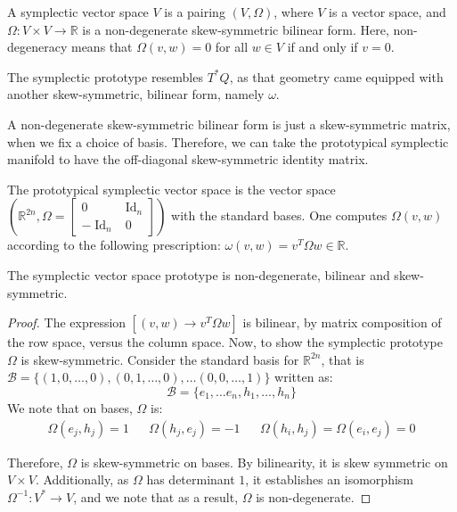 \begin{defn}
A symplectic vector space $V$ is a pairing $(V,\Omega)$, where $V$ is a vector space, and $\Omega: V \times V \to \mathbb{R}$ is a non-degenerate skew-symmetric bilinear form. Here, non-degeneracy means that $\Omega(v, w) = 0$ for all $w \in V$ if and only if $v = 0$.
\end{defn}

\begin{remark}
The symplectic prototype resembles $T^{*} Q$, as that geometry came equipped with another skew-symmetric, bilinear form, namely $\omega$.
\end{remark}

\begin{remark}
A non-degenerate skew-symmetric bilinear form is just a skew-symmetric matrix, when we fix a choice of basis. Therefore, we can take the prototypical symplectic manifold to have the off-diagonal skew-symmetric identity matrix. 
\end{remark}

\begin{example}
\label{SymVectorPrototype}
The prototypical symplectic vector space is the vector space $(\mathbb{R}^{2n}, \Omega = \begin{bmatrix}
    0 & \operatorname{Id}_{n} \\
    -\operatorname{Id}_{n} & 0
\end{bmatrix})$ with the standard bases. One computes $\Omega(v,w)$ according to the following prescription: $\omega(v,w) = v^{T} \Omega w \in \mathbb{R}$.
\end{example}

\begin{lemma}
The symplectic vector space prototype is non-degenerate, bilinear and skew-symmetric.
\end{lemma}

\begin{proof}
The expression $\left[ (v,w) \to v^{T} \Omega w \right]$ is bilinear, by matrix composition of the row space, versus the column space. Now, to show the symplectic prototype $\Omega$ is skew-symmetric. Consider the standard basis for $\mathbb{R}^{2n}$, that is $\mathcal{B} = \{ (1, 0, \dots, 0), (0, 1, \dots, 0), \dots (0, 0, \dots, 1) \}$ written as: 
$$\mathcal{B} = \{ e_{1}, \dots e_{n}, h_{1}, \dots, h_{n} \} $$
We note that on bases, $\Omega$ is:
\begin{align}
\Omega(e_{j}, h_{j}) = 1 && \Omega(h_{j}, e_{j}) = -1 && \Omega(h_{i}, h_{j}) = \Omega(e_{i}, e_{j}) = 0
\end{align}

\noindent Therefore, $\Omega$ is skew-symmetric on bases. By bilinearity, it is skew symmetric on $V \times V$. Additionally, as $\Omega$ has determinant $1$, it establishes an isomorphism $\Omega^{-1}: V^{*} \to V$, and we note that as a result, $\Omega$ is non-degenerate.
\end{proof}

